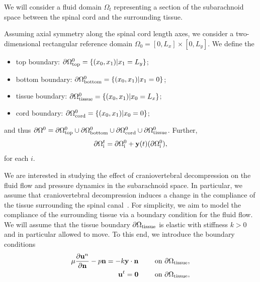 \documentclass[11pt,a4paper,titlepage]{report}
\begin{document}
We will consider a fluid domain $\Omega_t$ representing a section of
the subarachnoid space between the spinal cord and the surrounding
tissue.

Assuming axial symmetry along the spinal cord length axes, we consider
a two-dimensional rectangular reference domain $\Omega_0 = [0, L_x]
\times [0, L_y]$. We define the
\begin{itemize}
\item
  top boundary: $\partial \Omega_{\rm top}^0 = \{ (x_0, x_1) | x_1 = L_y\}$;
\item
  bottom boundary: $\partial \Omega_{\rm bottom}^0 = \{ (x_0, x_1) | x_1 = 0\}$;
\item
  tissue boundary: $\partial \Omega_{\rm tissue}^0 = \{ (x_0, x_1) | x_0 = L_x\}$;
\item
  cord boundary: $\partial \Omega_{\rm cord}^0 = \{ (x_0, x_1) | x_0 = 0\}$;
\end{itemize}
and thus $\partial \Omega^0 = \partial \Omega_{\rm top}^0 \cup
\partial \Omega_{\rm bottom}^0 \cup \partial \Omega_{\rm cord}^0 \cup
\partial \Omega_{\rm tissue}^0$. Further,
\begin{equation}
  \partial \Omega^t_{\rm i} = \partial \Omega^0_{\rm i} + \mathbf{y}(t)(\partial \Omega^0_{\rm i}),
\end{equation}
for each $i$.

We are interested in studying the effect of craniovertebral
decompression on the fluid flow and pressure dynamics in the
subarachnoid space. In particular, we assume that craniovertebral
decompression induces a change in the compliance of the tissue
surrounding the spinal canal~\cite{}. For simplicity, we aim to model
the compliance of the surrounding tissue via a boundary condition for
the fluid flow. We will assume that the tissue boundary $\partial
\Omega_{\rm tissue}$ is elastic with stiffness $k > 0$ and in particular
allowed to move. To this end, we introduce the boundary conditions
\begin{align}
\mu \frac{\partial \mathbf{u}^n}{\partial \mathbf{n}} - p \mathbf{n} = - k \mathbf{y} \cdot \mathbf{n} \qquad \text{ on } \partial \Omega_{\rm tissue},\\
\mathbf{u}^t = \mathbf{0} \qquad \text{ on } \partial \Omega_{\rm tissue},
\end{align}

\end{document}
